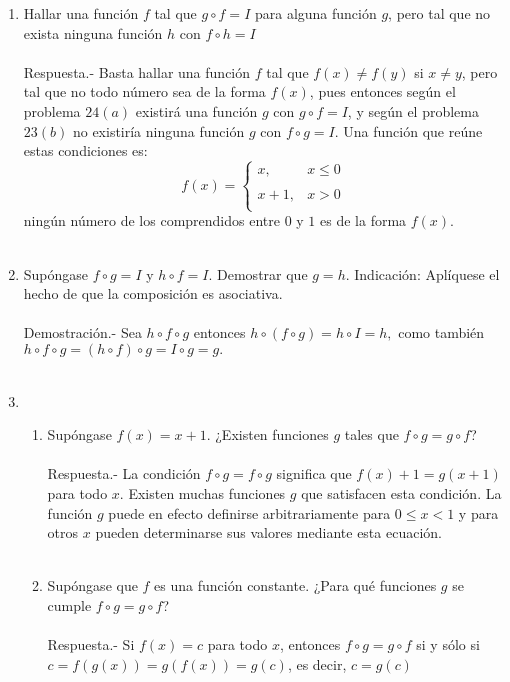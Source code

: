 \begin{enumerate}
	\item Hallar una función $f$ tal que $g\circ f=I$ para alguna función $g$, pero tal que no exista ninguna función $h$ con $f\circ h = I$\\\\
	    Respuesta.-\; Basta hallar una función $f$ tal que $f(x)\neq f(y)$ si $x\neq y$, pero tal que no todo número sea de la forma $f(x)$, pues entonces según el problema $24(a)$ existirá una función $g$ con $g\circ f=I$, y según el problema $23(b)$ no existiría ninguna función $g$ con $f\circ g=I$. Una función que reúne estas condiciones es:
	    $$f(x) = \left\{ \begin{array}{lc} 
		x,&x\leq 0\\
		\\ x+1,& x>0\\
	    \end{array}\right.$$
	    ningún número  de los comprendidos entre $0$ y $1$ es de la forma $f(x)$.\\\\

	\item Supóngase $f\circ g = I$ y $h\circ f = I$. Demostrar que $g=h$. Indicación: Aplíquese el hecho de que la composición es asociativa.\\\\
	    Demostración.-\; Sea $h\circ f\circ g$ entonces $h\circ (f \circ g)=h\circ I = h,$ como también $h\circ f \circ g = (h \circ f) \circ g = I \circ g = g.$\\\\ 

	\item 
	    \begin{enumerate}[\bfseries (a)]

		\item Supóngase $f(x)=x+1.$ ¿Existen funciones $g$ tales que $f\circ g = g\circ f$?\\\\
		    Respuesta.-\; La condición $f\circ g = f \circ g$ significa que $f(x) + 1 = g(x+1)$ para todo $x$. Existen muchas funciones $g$ que satisfacen esta condición. La función $g$ puede en efecto definirse arbitrariamente para $0\leq x < 1$ y para otros $x$ pueden determinarse sus valores mediante esta ecuación.\\\\

		\item Supóngase que $f$ es una función constante. ¿Para qué funciones $g$ se cumple $f\circ g = g\circ f$?\\\\
		    Respuesta.-\; Si $f(x)=c$ para todo $x$, entonces $f\circ g = g\circ f$ si y sólo si $c=f(g(x)) = g(f(x))=g(c)$, es decir, $c=g(c)$\\\\ 


\end{enumerate}
\end{enumerate}
